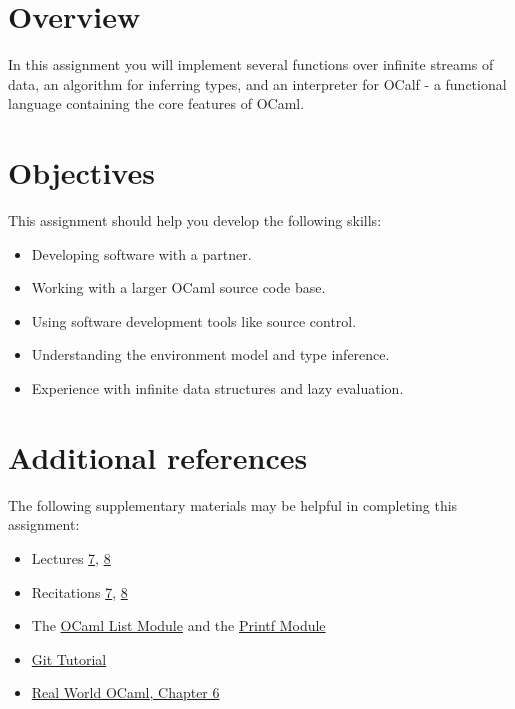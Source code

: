 \documentclass{pset}
\begin{document}
\maketitle

\section*{Overview}

In this assignment you will implement several functions over infinite streams
of data, an algorithm for inferring types, and an interpreter for OCalf - a
functional language containing the core features of OCaml.

\section*{Objectives}

This assignment should help you develop the following skills:

\begin{itemize}
\item Developing software with a partner.
\item Working with a larger OCaml source code base.
\item Using software development tools like source control.
\item Understanding the environment model and type inference.
\item Experience with infinite data structures and lazy evaluation.
\end{itemize}

\section*{Additional references}

The following supplementary materials may be helpful in completing this assignment:
\begin{itemize}
\item{} Lectures
    \href{http://www.cs.cornell.edu/courses/cs3110/2015sp/lectures/7/lec07.pdf}
    {7},
    \href{http://www.cs.cornell.edu/courses/cs3110/2015sp/lectures/8/lec08.pdf}
    {8}
\item{} Recitations
    \href{http://www.cs.cornell.edu/courses/cs3110/2015sp/recitations/7/rec07.php}
    {7},
    \href{http://www.cs.cornell.edu/courses/cs3110/2015sp/recitations/8/rec08.php}
    {8}
\item{} The \href{http://caml.inria.fr/pub/docs/manual-ocaml/libref/List.html}
    {OCaml List Module} and the
    \href{http://caml.inria.fr/pub/docs/manual-ocaml/libref/Printf.html}
    {Printf Module}
\item{} \href{https://git-scm.com/docs/gittutorial}{Git Tutorial}
\item{} \href{https://realworldocaml.org/v1/en/html/index.html}{Real World OCaml, Chapter 6} 
\end{itemize}
\end{document}
